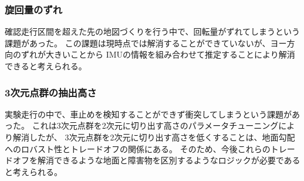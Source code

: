 \documentclass[twocolumn,9pt]{jsproceedings}
\begin{document}
\subsubsection{旋回量のずれ}
確認走行区間を超えた先の地図づくりを行う中で、回転量がずれてしまうという課題があった。
この課題は現時点では解消することができていないが、ヨー方向のずれが大きいことから
IMUの情報を組み合わせて推定することにより解消できると考えられる。

\subsubsection{3次元点群の抽出高さ}
実験走行の中で、車止めを検知することができず衝突してしまうという課題があった。
これは3次元点群を2次元に切り出す高さのパラメータチューニングにより解消したが、
3次元点群を2次元に切り出す高さを低くすることは、地面勾配へのロバスト性とトレードオフの関係にある。
そのため、今後これらのトレードオフを解消できるような地面と障害物を区別するようなロジックが必要であると考えられる。
\end{document}
